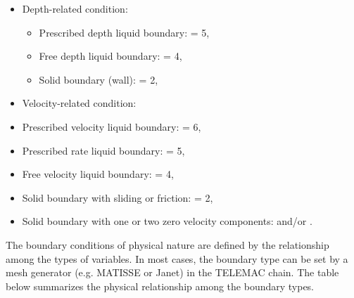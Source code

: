 \begin{itemize}
\item Depth-related condition:

\begin{itemize}
\item Prescribed depth liquid boundary:  = 5,

\item Free depth liquid boundary:  = 4,

\item Solid boundary (wall):  = 2,
\end{itemize}

\item Velocity-related condition:

\item Prescribed velocity liquid boundary:  = 6,

\item Prescribed rate liquid boundary:  = 5,

\item Free velocity liquid boundary:  = 4,

\item Solid boundary with sliding or friction:  = 2,

\item Solid boundary with one or two zero velocity components:  and/or
.
\end{itemize}

The boundary conditions of physical nature are defined by the relationship
among the types of variables. In most cases, the boundary type can be set by a
mesh generator (e.g. MATISSE or Janet) in the TELEMAC chain. The table
below summarizes the physical relationship among the boundary types.


